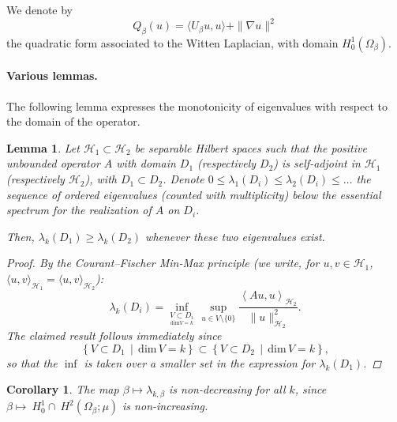 \documentclass[10pt]{article}
\newcommand{\1}{\mathbbm 1}
\newtheorem{lemma}{Lemma}
\newtheorem{corollary}{Corollary}
\begin{document}
    We denote by
    \begin{equation}
        \label{eq:witten_quad_form}
        Q_\beta(u) = \langle U_\beta u ,u \rangle + \|\nabla u\|^2
    \end{equation}
    the quadratic form associated to the Witten Laplacian, with domain $H_0^1(\Omega_\beta)$.

    \paragraph{Various lemmas.\newline}
    The following lemma expresses the monotonicity of eigenvalues with respect to the domain of the operator.
    \begin{lemma}
        \label{lemma:cf_monotonicity}
        Let $\mathcal H_1 \subset \mathcal H_2$ be separable Hilbert spaces such that the positive unbounded operator $A$ with domain $D_1$ (respectively $D_2$) is self-adjoint in $\mathcal H_1$ (respectively $\mathcal H_2$), with $D_1\subset D_2$.
        Denote $0 \leq \lambda_1(D_i) \leq \lambda_2(D_i)\leq \dots$ the sequence of ordered eigenvalues (counted with multiplicity) below the essential spectrum for the realization of $A$ on $D_i$.

        Then, $\lambda_k(D_1) \geq \lambda_k(D_2)$ whenever these two eigenvalues exist.

        \begin{proof}
        By the Courant--Fischer Min-Max principle (we write, for $u,v \in \mathcal H_1$, $\langle u,v\rangle_{\mathcal H_1} = \langle u,v\rangle_{\mathcal H_2}$):
        $$\lambda_k(D_i) = \underset{\underset{\mathrm{dim} V = k}{V\subset D_i}}{\inf}\,\underset{u\in V\setminus\{0\}}{\sup} \frac{\left\langle Au,u\right\rangle_{\mathcal H_2}}{\|u\|^2_{\mathcal H_2}}.$$
        The claimed result follows immediately since
        $$\left\{ V\subset D_1\,\middle|\,\mathrm{dim}\,V = k\right\} \subset \left\{ V\subset D_2\,\middle|\,\mathrm{dim}\,V = k\right\},$$
        so that the $\inf$ is taken over a smaller set in the expression for $\lambda_k(D_1)$.
        \end{proof}
    \end{lemma}
    \begin{corollary}
        The map $\beta \mapsto \lambda_{k,\beta}$ is non-decreasing for all $k$, since~$\beta\mapsto~H_0^1\cap~H^2(\Omega_\beta;\mu)$ is non-increasing.
    \end{corollary}
\end{document}
